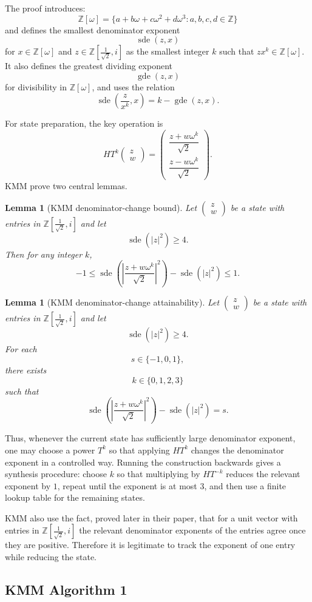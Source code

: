 \documentclass[11pt]{article}
\newtheorem{lemma}[theorem]{Lemma}
\newcommand{\Z}{\mathbb Z}
\newcommand{\Zw}{\mathbb Z[\omega]}
\newcommand{\Rring}{\mathbb Z\left[\frac{1}{\sqrt 2},i\right]}
\newcommand{\mat}[1]{\begin{pmatrix}#1\end{pmatrix}}
\begin{document}
The proof introduces:
\[
  \Zw=\{a+b\omega+c\omega^2+d\omega^3:a,b,c,d\in\Z\}
\]
and defines the smallest denominator exponent
\[
  \operatorname{sde}(z,x)
\]
for $x\in\Zw$ and $z\in\Rring$ as the smallest integer $k$ such that $zx^k\in\Zw$. It also defines the greatest dividing exponent
\[
  \operatorname{gde}(z,x)
\]
for divisibility in $\Zw$, and uses the relation
\[
  \operatorname{sde}\left(\frac z{x^k},x\right)=k-\operatorname{gde}(z,x).
\]

For state preparation, the key operation is
\[
  HT^k\mat{z\\w}
  =
  \mat{\dfrac{z+w\omega^k}{\sqrt2}\\[0.8em]
        \dfrac{z-w\omega^k}{\sqrt2}}.
\]
KMM prove two central lemmas.

\begin{lemma}[KMM denominator-change bound]
Let $\mat{z\\w}$ be a state with entries in $\Rring$ and let
\[
  \operatorname{sde}(|z|^2)\ge4.
\]
Then for any integer $k$,
\[
  -1\le
  \operatorname{sde}\left(\left|\frac{z+w\omega^k}{\sqrt2}\right|^2\right)
  -\operatorname{sde}(|z|^2)
  \le 1.
\]
\end{lemma}

\begin{lemma}[KMM denominator-change attainability]
Let $\mat{z\\w}$ be a state with entries in $\Rring$ and let
\[
  \operatorname{sde}(|z|^2)\ge4.
\]
For each
\[
  s\in\{-1,0,1\},
\]
there exists
\[
  k\in\{0,1,2,3\}
\]
such that
\[
  \operatorname{sde}\left(\left|\frac{z+w\omega^k}{\sqrt2}\right|^2\right)
  -\operatorname{sde}(|z|^2)=s.
\]
\end{lemma}

Thus, whenever the current state has sufficiently large denominator exponent, one may choose a power $T^k$ so that applying $HT^k$ changes the denominator exponent in a controlled way. Running the construction backwards gives a synthesis procedure: choose $k$ so that multiplying by $HT^{-k}$ reduces the relevant exponent by $1$, repeat until the exponent is at most $3$, and then use a finite lookup table for the remaining states.

KMM also use the fact, proved later in their paper, that for a unit vector with entries in $\Rring$ the relevant denominator exponents of the entries agree once they are positive. Therefore it is legitimate to track the exponent of one entry while reducing the state.

\subsection{KMM Algorithm 1}
\end{document}
